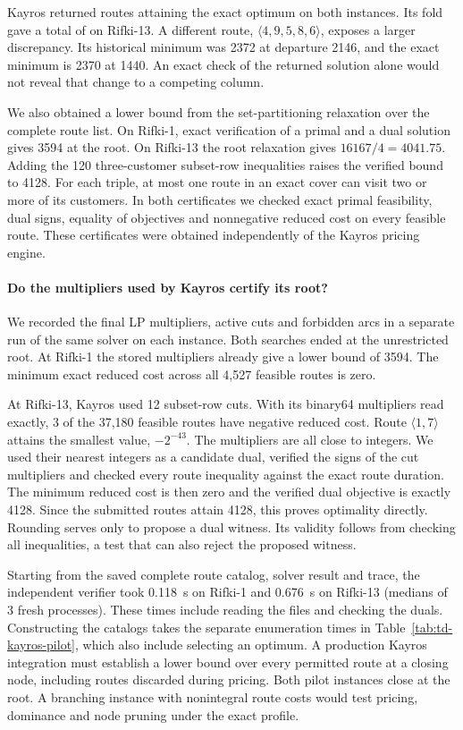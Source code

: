 Kayros returned routes attaining the exact optimum on both instances. Its fold gave a total of  on Rifki-13. A different route, $\langle4,9,5,8,6\rangle$, exposes a larger discrepancy. Its historical minimum was 2372 at departure 2146, and the exact minimum is 2370 at 1440. An exact check of the returned solution alone would not reveal that change to a competing column.

We also obtained a lower bound from the set-partitioning relaxation over the complete route list. On Rifki-1, exact verification of a primal and a dual solution gives 3594 at the root. On Rifki-13 the root relaxation gives $16167/4=4041.75$. Adding the 120 three-customer subset-row inequalities raises the verified bound to 4128. For each triple, at most one route in an exact cover can visit two or more of its customers. In both certificates we checked exact primal feasibility, dual signs, equality of objectives and nonnegative reduced cost on every feasible route. These certificates were obtained independently of the Kayros pricing engine.

\paragraph{Do the multipliers used by Kayros certify its root?}
We recorded the final LP multipliers, active cuts and forbidden arcs in a separate run of the same solver on each instance. Both searches ended at the unrestricted root. At Rifki-1 the stored multipliers already give a lower bound of 3594. The minimum exact reduced cost across all 4,527 feasible routes is zero.

At Rifki-13, Kayros used 12 subset-row cuts. With its binary64 multipliers read exactly, 3 of the 37,180 feasible routes have negative reduced cost. Route $\langle 1,7\rangle$ attains the smallest value, $-2^{-43}$. The multipliers are all close to integers. We used their nearest integers as a candidate dual, verified the signs of the cut multipliers and checked every route inequality against the exact route duration. The minimum reduced cost is then zero and the verified dual objective is exactly 4128. Since the submitted routes attain 4128, this proves optimality directly. Rounding serves only to propose a dual witness. Its validity follows from checking all inequalities, a test that can also reject the proposed witness.

Starting from the saved complete route catalog, solver result and trace, the independent verifier took 0.118~s on Rifki-1 and 0.676~s on Rifki-13 (medians of 3 fresh processes). These times include reading the files and checking the duals. Constructing the catalogs takes the separate enumeration times in Table~\ref{tab:td-kayros-pilot}, which also include selecting an optimum. A production Kayros integration must establish a lower bound over every permitted route at a closing node, including routes discarded during pricing. Both pilot instances close at the root. A branching instance with nonintegral route costs would test pricing, dominance and node pruning under the exact profile.
